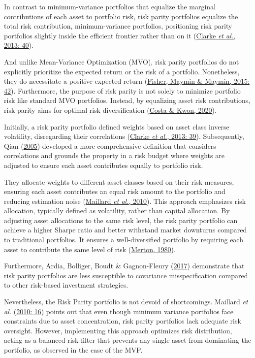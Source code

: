 \documentclass[12pt,preprint, authoryear]{elsarticle}
\numberwithin{equation}{section}
\numberwithin{figure}{section}
\numberwithin{table}{section}
\begin{document}
In contrast to minimum-variance portfolios that equalize the marginal
contributions of each asset to portfolio risk, risk parity portfolios
equalize the total risk contribution, minimum-variance portfolios,
positioning risk parity portfolios slightly inside the efficient
frontier rather than on it
(\protect\hyperlink{ref-clarke2013risk}{Clarke \emph{et al.}, 2013:
40}).

And unlike Mean-Variance Optimization (MVO), risk parity portfolios do
not explicitly prioritize the expected return or the risk of a
portfolio. Nonetheless, they do necessitate a positive expected return
(\protect\hyperlink{ref-fisher2015risk}{Fisher, Maymin \& Maymin, 2015:
42}). Furthermore, the purpose of risk parity is not solely to minimize
portfolio risk like standard MVO portfolios. Instead, by equalizing
asset risk contributions, risk parity aims for optimal risk
diversification (\protect\hyperlink{ref-costa2020robust}{Costa \& Kwon,
2020}).

Initially, a risk parity portfolio defined weights based on asset class
inverse volatility, disregarding their correlations
(\protect\hyperlink{ref-clarke2013risk}{Clarke \emph{et al.}, 2013:
39}). Subsequently, Qian
(\protect\hyperlink{ref-qian2005financial}{2005}) developed a more
comprehensive definition that considers correlations and grounds the
property in a risk budget where weights are adjusted to ensure each
asset contributes equally to portfolio risk.

They allocate weights to different asset classes based on their risk
measures, ensuring each asset contributes an equal risk amount to the
portfolio and reducing estimation noise
(\protect\hyperlink{ref-maillard2010properties}{Maillard \emph{et al.},
2010}). This approach emphasizes risk allocation, typically defined as
volatility, rather than capital allocation. By adjusting asset
allocations to the same risk level, the risk parity portfolio can
achieve a higher Sharpe ratio and better withstand market downturns
compared to traditional portfolios. It ensures a well-diversified
portfolio by requiring each asset to contribute the same level of risk
(\protect\hyperlink{ref-merton1980estimating}{Merton, 1980}).

Furthermore, Ardia, Bolliger, Boudt \& Gagnon-Fleury
(\protect\hyperlink{ref-ardia2017impact}{2017}) demonstrate that risk
parity portfolios are less susceptible to covariance misspecification
compared to other risk-based investment strategies.

Nevertheless, the Risk Parity portfolio is not devoid of shortcomings.
Maillard \emph{et al.}
(\protect\hyperlink{ref-maillard2010properties}{2010: 16}) points out
that even though minimum variance portfolios face constraints due to
asset concentration, risk parity portfolios lack adequate risk
oversight. However, implementing this approach optimizes risk
distribution, acting as a balanced risk filter that prevents any single
asset from dominating the portfolio, as observed in the case of the MVP.
\end{document}
